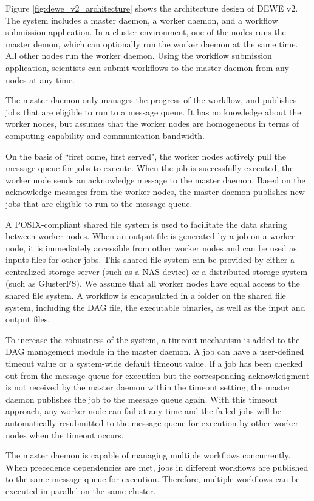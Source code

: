 Figure \ref{fig:dewe_v2_architecture} shows the architecture design of DEWE v2. The system includes a master daemon, a worker daemon, and a workflow submission application. In a cluster environment, one of the nodes runs the master demon, which can optionally run the worker daemon at the same time. All other nodes run the worker daemon. Using the workflow submission application, scientists can submit workflows to the master daemon from any nodes at any time. 

The master daemon only manages the progress of the workflow, and publishes jobs that are eligible to run to a message queue. It has no knowledge about the worker nodes, but assumes that the worker nodes are homogeneous in terms of computing capability and communication bandwidth. 

On the basis of ``first come, first served", the worker nodes actively pull the message queue for jobs to execute. When the job is successfully executed, the worker node sends an acknowledge message to the master daemon. Based on the acknowledge messages from the worker nodes, the master daemon publishes new jobs that are eligible to run to the message queue.

A POSIX-compliant shared file system is used to facilitate the data sharing between worker nodes. When an output file is generated by a job on a worker node, it is immediately accessible from other worker nodes and can be used as inputs files for other jobs. This shared file system can be provided by either a centralized storage server (such as a NAS device) or a distributed storage system (such as GlusterFS). We assume that all worker nodes have equal access to the shared file system. A workflow is encapsulated in a folder on the shared file system, including the DAG file, the executable binaries, as well as the input and output files. 

To increase the robustness of the system, a timeout mechanism is added to the DAG management module in the master daemon. A job can have a user-defined timeout value or a system-wide default timeout value. If a job has been checked out from the message queue for execution but the corresponding acknowledgment is not received by the master daemon within the timeout setting, the master daemon publishes the job to the message queue again. With this timeout approach, any worker node can fail at any time and the failed jobs will be automatically resubmitted to the message queue for execution by other worker nodes when the timeout occurs.

The master daemon is capable of managing multiple workflows concurrently. When precedence dependencies are met, jobs in different workflows are published to the same message queue for execution. Therefore, multiple workflows can be executed in parallel on the same cluster. 

